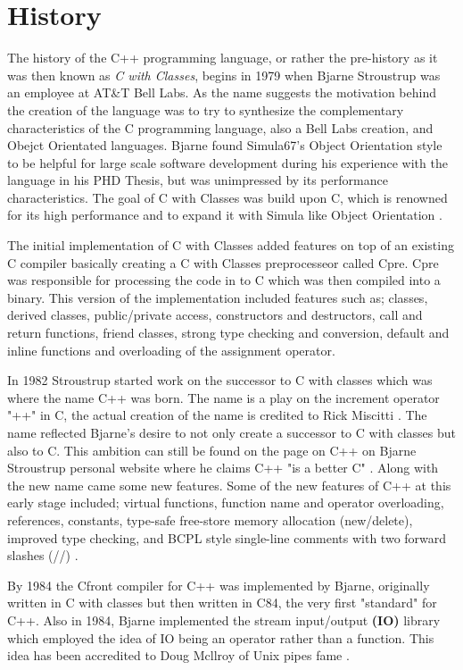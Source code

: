 \documentclass[conference, a4paper]{IEEEtran}
\begin{document}
\section{History}
The history of the C++ programming language, or rather the pre-history as it was then known as \textit{C with Classes}, begins in 1979 when Bjarne Stroustrup was an employee at AT\&T Bell Labs. As the name suggests the motivation behind the creation of the language was to try to synthesize the complementary characteristics of the C programming language, also a Bell Labs creation, and Obejct Orientated languages. Bjarne found Simula67's Object Orientation style to be helpful for large scale software development during his experience with the language in his PHD Thesis, but was unimpressed by its performance characteristics. The goal of C with Classes was build upon C, which is renowned for its high performance and to expand it with Simula like Object Orientation \cite{cppevolving}.

The initial implementation of C with Classes added features on top of an existing C compiler basically creating a C with Classes preprocesseor called Cpre. Cpre was responsible for processing the code in to C which was then compiled into a binary. This version of the implementation included features such as; classes, derived classes, public/private access, constructors and destructors, call and return functions, friend classes, strong type checking and conversion, default and inline functions and overloading of the assignment operator. 

In 1982 Stroustrup started work on the successor to C with classes which was where the name C++ was born. The name is a play on the increment operator "++" in C, the actual creation of the name is credited to Rick Miscitti \cite{cpphistory}. The name reflected Bjarne's desire to not only create a successor to C with classes but also to C. This ambition can still be found on the page on C++ on Bjarne Stroustrup personal website where he claims C++ "is a better C" \cite{cpphome}. Along with the new name came some new features. Some of the new features of C++ at this early stage included; virtual functions, function name and operator overloading, references, constants, type-safe free-store memory allocation (new/delete), improved type checking, and BCPL style single-line comments with two forward slashes (//) \cite{cpphistory}. 

By 1984 the Cfront compiler for C++ was implemented by Bjarne, originally written in C with classes but then written in C84, the very first "standard" for C++. Also in 1984, Bjarne implemented the stream input/output \textbf{(IO)} library which employed the idea of IO being an operator rather than a function. This idea has been accredited to Doug Mcllroy of Unix pipes fame \cite{cpphistory}. 
\end{document}
